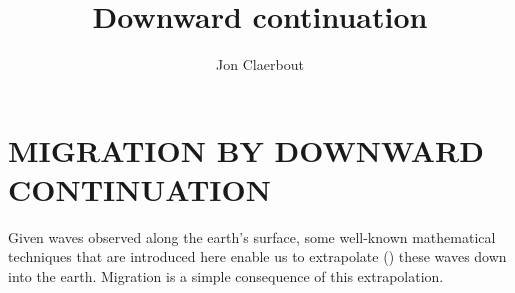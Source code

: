 \def\CAKEDIR{.}

\title{Downward continuation}
\author{Jon Claerbout}
\maketitle
\label{paper:dwnc}


\section{MIGRATION BY DOWNWARD CONTINUATION}
Given waves observed along the earth's surface,
some well-known mathematical techniques
that are introduced here
enable us to extrapolate
()
these waves down into the earth.
Migration is a simple consequence of this extrapolation.

